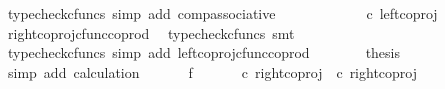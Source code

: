 \begin{isabellebody}
\ {\isacharparenleft}{\kern0pt}typecheck{\isacharunderscore}{\kern0pt}cfuncs{\isacharcomma}{\kern0pt}\ simp\ add{\isacharcolon}{\kern0pt}\ comp{\isacharunderscore}{\kern0pt}associative{}{\isacharparenright}{\kern0pt}\isanewline
\ \ \ \ \isamarkupfalse%
\ \isamarkupfalse%
\ {\isachardoublequoteopen}{\isachardot}{\kern0pt}{\isachardot}{\kern0pt}{\isachardot}{\kern0pt}\ {\isacharequal}{\kern0pt}\ {\isasymlangle}{\isasymt}{\isacharcomma}{\kern0pt}{\isasymf}{\isasymrangle}\ {\isasymamalg}\ {\isasymlangle}{\isasymf}{\isacharcomma}{\kern0pt}{\isasymt}{\isasymrangle}\ {\isasymcirc}\isactrlsub c\ left{\isacharunderscore}{\kern0pt}coproj\ {\isasymone}\ {\isasymone}{\isachardoublequoteclose}\isanewline
\ \ \ \ \ \ \isamarkupfalse%
\ right{\isacharunderscore}{\kern0pt}coproj{\isacharunderscore}{\kern0pt}cfunc{\isacharunderscore}{\kern0pt}coprod\ \isamarkupfalse%
\ {\isacharparenleft}{\kern0pt}typecheck{\isacharunderscore}{\kern0pt}cfuncs{\isacharcomma}{\kern0pt}\ smt{\isacharparenright}{\kern0pt}\isanewline
\ \ \ \ \isamarkupfalse%
\ \isamarkupfalse%
\ {\isachardoublequoteopen}{\isachardot}{\kern0pt}{\isachardot}{\kern0pt}{\isachardot}{\kern0pt}\ {\isacharequal}{\kern0pt}\ {\isasymlangle}{\isasymt}{\isacharcomma}{\kern0pt}{\isasymf}{\isasymrangle}{\isachardoublequoteclose}\isanewline
\ \ \ \ \ \ \isamarkupfalse%
\ {\isacharparenleft}{\kern0pt}typecheck{\isacharunderscore}{\kern0pt}cfuncs{\isacharcomma}{\kern0pt}\ simp\ add{\isacharcolon}{\kern0pt}\ left{\isacharunderscore}{\kern0pt}coproj{\isacharunderscore}{\kern0pt}cfunc{\isacharunderscore}{\kern0pt}coprod{\isacharparenright}{\kern0pt}\isanewline
\ \ \ \ \isamarkupfalse%
\ \isamarkupfalse%
\ {\isacharquery}{\kern0pt}thesis\isanewline
\ \ \ \ \ \ \isamarkupfalse%
\ {\isacharparenleft}{\kern0pt}simp\ add{\isacharcolon}{\kern0pt}\ calculation{\isacharparenright}{\kern0pt}\isanewline
\ \ \isamarkupfalse%
\isanewline
\ \ \isamarkupfalse%
\ f{}{\isacharcolon}{\kern0pt}\ {\isachardoublequoteopen}{\isasymlangle}{\isasymf}{\isacharcomma}{\kern0pt}\ {\isasymf}{\isasymrangle}\ {\isasymamalg}\ {\isasymlangle}{\isasymt}{\isacharcomma}{\kern0pt}{\isasymf}{\isasymrangle}\ {\isasymamalg}\ {\isasymlangle}{\isasymf}{\isacharcomma}{\kern0pt}{\isasymt}{\isasymrangle}\ {\isasymcirc}\isactrlsub c\ {\isacharparenleft}{\kern0pt}right{\isacharunderscore}{\kern0pt}coproj\ {\isasymone}\ {\isacharparenleft}{\kern0pt}{\isasymone}{\isasymCoprod}{\isasymone}{\isacharparenright}{\kern0pt}{\isasymcirc}\isactrlsub c\ right{\isacharunderscore}{\kern0pt}coproj\ {\isasymone}\ {\isasymone}{\isacharparenright}{\kern0pt}\ {\isacharequal}{\kern0pt}\ {\isasymlangle}{\isasymf}{\isacharcomma}{\kern0pt}{\isasymt}{\isasymrangle}{\isachardoublequoteclose}\isanewline

\end{isabellebody}
